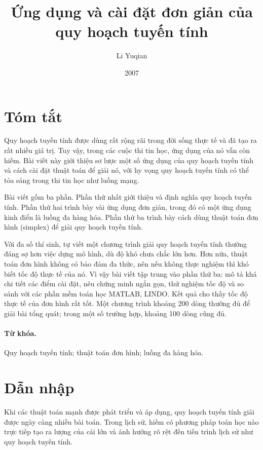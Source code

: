 \documentclass[11pt]{article}
\title{Ứng dụng và cài đặt đơn giản của quy hoạch tuyến tính}
\author{Li Yuqian}
\date{2007}
\begin{document}
\maketitle


\section*{Tóm tắt}

Quy hoạch tuyến tính được dùng rất rộng rãi trong đời sống thực tế và đã tạo
ra rất nhiều giá trị. Tuy vậy, trong các cuộc thi tin học, ứng dụng của nó
vẫn còn hiếm. Bài viết này giới thiệu sơ lược một số ứng dụng của quy hoạch
tuyến tính và cách cài đặt thuật toán để giải nó, với hy vọng quy hoạch
tuyến tính có thể tỏa sáng trong thi tin học như luồng mạng.

Bài viết gồm ba phần. Phần thứ nhất giới thiệu và định nghĩa quy hoạch tuyến
tính. Phần thứ hai trình bày vài ứng dụng đơn giản, trong đó có một ứng dụng
kinh điển là luồng đa hàng hóa. Phần thứ ba trình bày cách dùng thuật toán
đơn hình (simplex) để giải quy hoạch tuyến tính.

Với đa số thí sinh, tự viết một chương trình giải quy hoạch tuyến tính thường
đáng sợ hơn việc dựng mô hình, dù độ khó chưa chắc lớn hơn. Hơn nữa, thuật
toán đơn hình không có bảo đảm đa thức, nên nếu không thực nghiệm thì khó
biết tốc độ thực tế của nó. Vì vậy bài viết tập trung vào phần thứ ba: mô tả
khá chi tiết các điểm cài đặt, nêu chứng minh ngắn gọn, thử nghiệm tốc độ và
so sánh với các phần mềm toán học MATLAB, LINDO. Kết quả cho thấy tốc độ thực
tế của đơn hình rất tốt. Một chương trình khoảng 200 dòng thường đủ để giải
bài tổng quát; trong một số trường hợp, khoảng 100 dòng cũng đủ.

\paragraph{Từ khóa.}
Quy hoạch tuyến tính; thuật toán đơn hình; luồng đa hàng hóa.

\section*{Dẫn nhập}

Khi các thuật toán mạnh được phát triển và áp dụng, quy hoạch tuyến tính giải
được ngày càng nhiều bài toán. Trong lịch sử, hiếm có phương pháp toán học
nào trực tiếp tạo ra lượng của cải lớn và ảnh hưởng rõ rệt đến tiến trình
lịch sử như quy hoạch tuyến tính.
\end{document}
